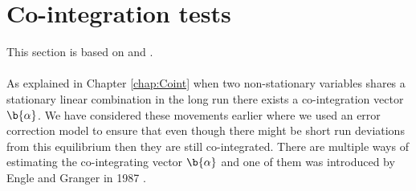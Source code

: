 \chapter{Co-integration tests}
This section is based on \cite{Analysis_of_integrated_and_cointegrated_time_series_with_R} and \cite{Engle_grang_test}.\\\\
\noindent As explained in Chapter \ref{chap:Coint} when two non-stationary variables shares a stationary linear combination in the long run there exists a co-integration vector $\b{\alpha}$. We have considered these movements earlier where we used an error correction model to ensure that even though there might be short run deviations from this equilibrium then they are still co-integrated. There are multiple ways of estimating the co-integrating vector $\b{\alpha}$ and one of them was introduced by Engle and Granger in 1987 \cite{co-Integration_and_error_correction}.
